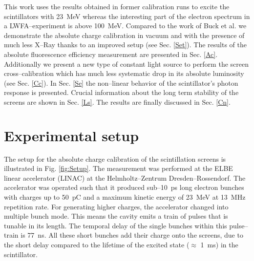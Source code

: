 \documentclass[%
preprint,
amsmath,
amssymb,
aip,
rsi, 
numerical,
floatfix,
]{revtex4-1}
\newcommand{\myCite}[1]{\textcolor{blue}{\cite{#1}}}
\begin{document}
This work uses the results obtained in former calibration runs\myCite{Glinec2006,Nakamura2011} to excite the scintillators with \SI{23}{\mega\electronvolt} whereas the interesting part of the electron spectrum in a LWFA--experiment is above \SI{100}{\mega\electronvolt}.
Compared to the work of Buck et al.\myCite{Buck2010} we demonstrate the absolute charge calibration in vacuum and with the presence of much less X--Ray thanks to an improved setup (see Sec. \ref{Set}).
The results of the absolute fluorescence efficiency measurement are presented in Sec. \ref{Ac}.
Additionally we present a new type of constant light source to perform the screen cross--calibration which has much less systematic drop in its absolute luminosity (see Sec. \ref{Cc}).
In Sec. \ref{Se} the non--linear behavior of the scintillator's photon response is presented.
Crucial information about the long term stability of the screens are shown in Sec. \ref{Ls}. 
The results are finally discussed in Sec. \ref{Cn}.

\section{\label{Set} Experimental setup}

The setup for the absolute charge calibration of the scintillation screens is illustrated in Fig. \ref{fig:Setup}.
The measurement was performed at the ELBE linear accelerator (LINAC) at the Helmholtz--Zentrum Dresden--Rossendorf. 
The accelerator was operated such that it produced sub--\SI{10}{\pico\second} long electron bunches with charges up to \SI{50}{\pico\coulomb} and a maximum kinetic energy of \SI{23}{\mega\electronvolt} at \SI{13}{\mega\hertz} repetition rate.  
For generating higher charges, the accelerator changed into multiple bunch mode. 
This means the cavity emits a train of pulses that is tunable in its length.
The temporal delay of the single bunches within this pulse--train is \SI{77}{\nano\second}. 
All these short bunches add their charge onto the screens, due to the short delay compared to the lifetime of the excited state ($\approx$ \SI{1}{\milli\second}) in the scintillator\myCite{Morlotti1997}.
\end{document}

